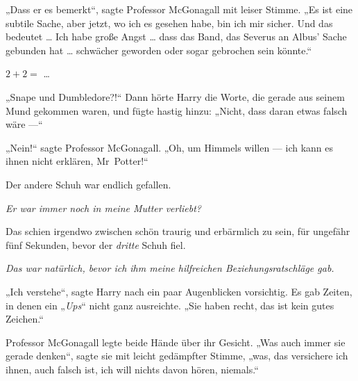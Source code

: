„Dass er es bemerkt“, sagte Professor McGonagall mit leiser Stimme.
„Es ist eine subtile Sache, aber jetzt, wo ich es gesehen habe, bin ich mir sicher. Und das bedeutet … Ich habe große Angst … dass das Band, das Severus an Albus’ Sache gebunden hat … schwächer geworden oder sogar gebrochen sein könnte.“

$2 + 2 = $ …

„Snape und Dumbledore?!“
Dann hörte Harry die Worte, die gerade aus seinem Mund gekommen waren, und fügte hastig hinzu:
„Nicht, dass daran etwas falsch wäre —“

„Nein!“ sagte Professor McGonagall.
„Oh, um Himmels willen — ich kann es ihnen nicht erklären, Mr~Potter!“

Der andere Schuh war endlich gefallen.

\emph{Er war immer noch in meine Mutter verliebt?}

Das schien irgendwo zwischen schön traurig und erbärmlich zu sein, für ungefähr fünf Sekunden, bevor der \emph{dritte} Schuh fiel.

\emph{Das war natürlich, bevor ich ihm meine hilfreichen Beziehungsratschläge gab.}

„Ich verstehe“, sagte Harry nach ein paar Augenblicken vorsichtig.
Es gab Zeiten, in denen ein
„\emph{Ups}“ nicht ganz ausreichte.
„Sie haben recht, das ist kein gutes Zeichen.“

Professor McGonagall legte beide Hände über ihr Gesicht.
„Was auch immer sie gerade denken“, sagte sie mit leicht gedämpfter Stimme, „was, das versichere ich ihnen, auch falsch ist, ich will nichts davon hören, niemals.“

